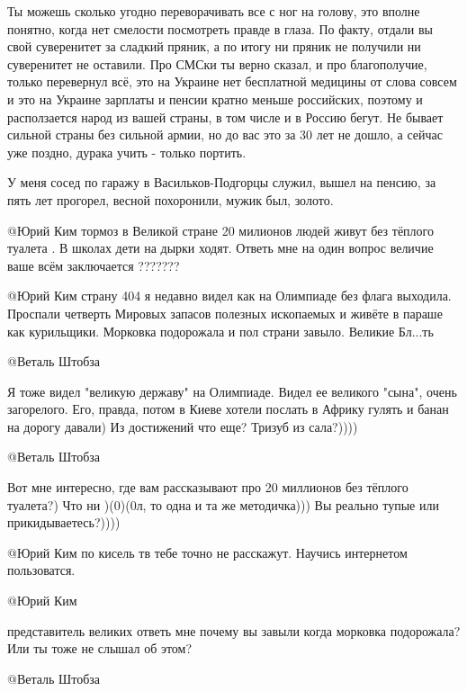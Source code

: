\begin{itemize}
\begin{multicols}{2}
\begin{itemize}
Ты можешь сколько угодно переворачивать все с ног на голову, это вполне
понятно, когда нет смелости посмотреть правде в глаза. По факту, отдали вы свой
суверенитет за сладкий пряник, а по итогу ни пряник не получили ни суверенитет
не оставили. Про СМСки ты верно сказал, и про благополучие, только перевернул
всё, это на Украине нет бесплатной медицины от слова совсем и это на Украине
зарплаты и пенсии кратно меньше российских, поэтому и расползается народ из
вашей страны, в том числе и в Россию бегут. Не бывает сильной страны без
сильной армии, но до вас это за 30 лет не дошло, а сейчас уже поздно, дурака
учить - только портить.


У меня сосед по гаражу в Васильков-Подгорцы служил, вышел на пенсию, за пять лет
прогорел, весной похоронили, мужик был, золото.


@Юрий Ким   тормоз в Великой стране 20 милионов людей живут без тёплого
туалета . В школах дети на дырки ходят. Ответь мне на один вопрос величие
ваше всём заключается ???????


@Юрий Ким   страну 404  я недавно видел как на Олимпиаде без флага выходила.
Проспали четверть Мировых запасов полезных ископаемых и живёте в параше как
курильщики. Морковка подорожала и пол страни завыло. Великие Бл...ть

@Веталь Штобза  

Я тоже видел "великую державу" на Олимпиаде. Видел ее великого "сына", очень
загорелого. Его, правда, потом в Киеве хотели послать в Африку гулять и банан
на дорогу давали) Из достижений что еще?  Тризуб из сала?))))


@Веталь Штобза  

Вот мне интересно, где вам рассказывают про 20 миллионов без тёплого туалета?)
Что ни )(0)(0л, то одна и та же методичка)))
Вы реально тупые или прикидываетесь?))))


@Юрий Ким   по кисель тв тебе точно не расскажут. Научись интернетом
пользоватся.

 @Юрий Ким   

представитель великих ответь мне почему вы завыли когда морковка подорожала?
Или ты тоже не слышал об этом?

 @Веталь Штобза  


\end{itemize}
\end{multicols}
\end{itemize}
